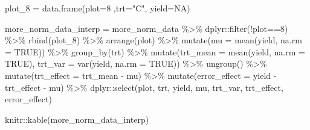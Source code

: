 \documentclass[
]{book}
\newenvironment{Shaded}{\begin{snugshade}}{\end{snugshade}}
\newcommand{\AttributeTok}[1]{\textcolor[rgb]{0.77,0.63,0.00}{#1}}
\newcommand{\ConstantTok}[1]{\textcolor[rgb]{0.00,0.00,0.00}{#1}}
\newcommand{\DecValTok}[1]{\textcolor[rgb]{0.00,0.00,0.81}{#1}}
\newcommand{\FunctionTok}[1]{\textcolor[rgb]{0.00,0.00,0.00}{#1}}
\newcommand{\NormalTok}[1]{#1}
\newcommand{\OtherTok}[1]{\textcolor[rgb]{0.56,0.35,0.01}{#1}}
\newcommand{\SpecialCharTok}[1]{\textcolor[rgb]{0.00,0.00,0.00}{#1}}
\newcommand{\StringTok}[1]{\textcolor[rgb]{0.31,0.60,0.02}{#1}}
\begin{document}
\begin{Shaded}
\begin{Highlighting}[]
\NormalTok{plot\_8 }\OtherTok{=} \FunctionTok{data.frame}\NormalTok{(}\AttributeTok{plot=}\DecValTok{8}\NormalTok{ ,}\AttributeTok{trt=}\StringTok{"C"}\NormalTok{, }\AttributeTok{yield=}\ConstantTok{NA}\NormalTok{)}

\NormalTok{more\_norm\_data\_interp }\OtherTok{=}\NormalTok{ more\_norm\_data }\SpecialCharTok{\%\textgreater{}\%}
\NormalTok{  dplyr}\SpecialCharTok{::}\FunctionTok{filter}\NormalTok{(}\SpecialCharTok{!}\NormalTok{plot}\SpecialCharTok{==}\DecValTok{8}\NormalTok{) }\SpecialCharTok{\%\textgreater{}\%}
  \FunctionTok{rbind}\NormalTok{(plot\_8)  }\SpecialCharTok{\%\textgreater{}\%}
  \FunctionTok{arrange}\NormalTok{(plot) }\SpecialCharTok{\%\textgreater{}\%}
  \FunctionTok{mutate}\NormalTok{(}\AttributeTok{mu =} \FunctionTok{mean}\NormalTok{(yield, }\AttributeTok{na.rm =} \ConstantTok{TRUE}\NormalTok{)) }\SpecialCharTok{\%\textgreater{}\%}
  \FunctionTok{group\_by}\NormalTok{(trt) }\SpecialCharTok{\%\textgreater{}\%}
  \FunctionTok{mutate}\NormalTok{(}\AttributeTok{trt\_mean =} \FunctionTok{mean}\NormalTok{(yield, }\AttributeTok{na.rm =} \ConstantTok{TRUE}\NormalTok{),}
         \AttributeTok{trt\_var =} \FunctionTok{var}\NormalTok{(yield, }\AttributeTok{na.rm =} \ConstantTok{TRUE}\NormalTok{)) }\SpecialCharTok{\%\textgreater{}\%}
  \FunctionTok{ungroup}\NormalTok{() }\SpecialCharTok{\%\textgreater{}\%}
  \FunctionTok{mutate}\NormalTok{(}\AttributeTok{trt\_effect =}\NormalTok{ trt\_mean }\SpecialCharTok{{-}}\NormalTok{ mu) }\SpecialCharTok{\%\textgreater{}\%}
  \FunctionTok{mutate}\NormalTok{(}\AttributeTok{error\_effect =}\NormalTok{ yield }\SpecialCharTok{{-}}\NormalTok{ trt\_effect }\SpecialCharTok{{-}}\NormalTok{ mu) }\SpecialCharTok{\%\textgreater{}\%}
\NormalTok{  dplyr}\SpecialCharTok{::}\FunctionTok{select}\NormalTok{(plot, trt, yield, mu, trt\_var, trt\_effect, error\_effect)}

\NormalTok{knitr}\SpecialCharTok{::}\FunctionTok{kable}\NormalTok{(more\_norm\_data\_interp)}
\end{Highlighting}
\end{Shaded}
\end{document}
